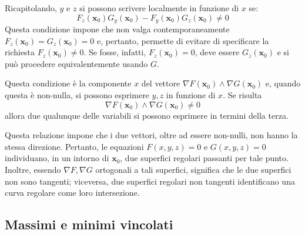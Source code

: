 \documentclass[10pt, a4paper]{scrartcl}
\theoremstyle{definition}
\numberwithin{esempio}{section}
\theoremstyle{definition}
\numberwithin{obs}{section}
\numberwithin{nota}{section}
\numberwithin{equation}{subsection}
\begin{document}
Ricapitolando, $y$ e $z$ si possono scrivere localmente in funzione di $x$ se:
\begin{equation}
	F_z(\mathbf{x} _0) G_y(\mathbf{x} _0) - F_y(\mathbf{x} _0) G_z(\mathbf{x} _0) \neq 0
\end{equation}
Questa condizione impone che non valga contemporaneamente $F_z(\mathbf{x} _0) = G_z(\mathbf{x} _0) = 0$ e, pertanto, permette di evitare di specificare la richiesta $F_z(\mathbf{x} _0)\neq 0$.
Se fosse, infatti, $F_z (\mathbf{x} _0) = 0$, deve essere $G_z(\mathbf{x} _0)$ e si pu\`o procedere equivalentemente usando $G$.

Questa condizione \`e la componente $x$ del vettore $\nabla F(\mathbf{x} _0) \wedge \nabla G(\mathbf{x} _0)$ e, quando questa \`e non-nulla, si possono esprimere $y,z$ in funzione di $x$.
Se risulta 
\begin{equation}
	\nabla F(\mathbf{x} _0) \wedge \nabla G(\mathbf{x} _0) \neq 0
\end{equation}
allora due qualunque delle variabili si possono esprimere in termini della terza.

Questa relazione impone che i due vettori, oltre ad essere non-nulli, non hanno la stessa direzione. 
Pertanto, le equazioni $F(x,y,z) = 0$ e $G(x,y,z) = 0$ individuano, in un intorno di $\mathbf{x} _0$, due superfici regolari passanti per tale punto.
Inoltre, essendo $\nabla F, \nabla G$ ortogonali a tali superfici, significa che le due superfici non sono tangenti; viceversa, due superfici regolari non tangenti identificano una curva regolare come loro intersezione.

\subsection{Massimi e minimi vincolati}
\end{document}
